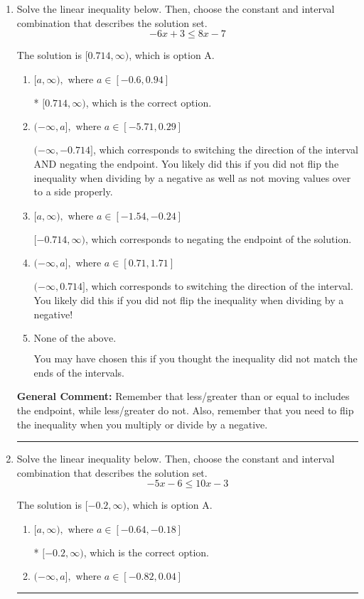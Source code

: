 \documentclass{extbook}[14pt]
\newcommand{\litem}[1]{\item #1

\rule{\textwidth}{0.4pt}}
\begin{document}
\begin{enumerate}\litem{
Solve the linear inequality below. Then, choose the constant and interval combination that describes the solution set.
\[ -6x + 3 \leq 8x -7 \]

The solution is \( [0.714, \infty) \), which is option A.\begin{enumerate}[label=\Alph*.]
\item \( [a, \infty), \text{ where } a \in [-0.6, 0.94] \)

* $[0.714, \infty)$, which is the correct option.
\item \( (-\infty, a], \text{ where } a \in [-5.71, 0.29] \)

 $(-\infty, -0.714]$, which corresponds to switching the direction of the interval AND negating the endpoint. You likely did this if you did not flip the inequality when dividing by a negative as well as not moving values over to a side properly.
\item \( [a, \infty), \text{ where } a \in [-1.54, -0.24] \)

 $[-0.714, \infty)$, which corresponds to negating the endpoint of the solution.
\item \( (-\infty, a], \text{ where } a \in [0.71, 1.71] \)

 $(-\infty, 0.714]$, which corresponds to switching the direction of the interval. You likely did this if you did not flip the inequality when dividing by a negative!
\item \( \text{None of the above}. \)

You may have chosen this if you thought the inequality did not match the ends of the intervals.
\end{enumerate}

\textbf{General Comment:} Remember that less/greater than or equal to includes the endpoint, while less/greater do not. Also, remember that you need to flip the inequality when you multiply or divide by a negative.
}
\litem{
Solve the linear inequality below. Then, choose the constant and interval combination that describes the solution set.
\[ -5x -6 \leq 10x -3 \]

The solution is \( [-0.2, \infty) \), which is option A.\begin{enumerate}[label=\Alph*.]
\item \( [a, \infty), \text{ where } a \in [-0.64, -0.18] \)

* $[-0.2, \infty)$, which is the correct option.
\item \( (-\infty, a], \text{ where } a \in [-0.82, 0.04] \)


\end{enumerate}}
\end{enumerate}
\end{document}
